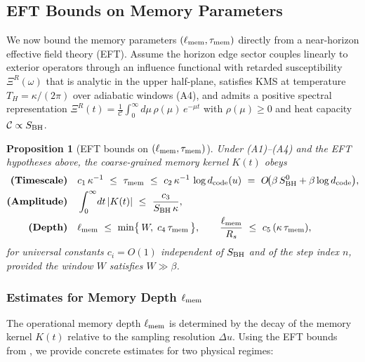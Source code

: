 \documentclass[11pt,a4paper]{article}
\providecommand{\texorpdfstring}[2]{#1}
\theoremstyle{plain}
\newtheorem{proposition}[theorem]{Proposition}
\theoremstyle{definition}
\theoremstyle{remark}
\begin{document}
\subsection{EFT Bounds on Memory Parameters}
\label{sec:eft-bounds}
We now bound the memory parameters $(\ell_{\rm mem},\tau_{\rm mem})$ directly from a near-horizon effective field theory (EFT).
Assume the horizon edge sector couples linearly to exterior operators through an influence functional with retarded susceptibility
$\Xi^R(\omega)$ that is analytic in the upper half-plane, satisfies KMS at temperature $T_H=\kappa/(2\pi)$ over adiabatic windows
(A4), and admits a positive spectral representation $\Xi^R(t)=\frac{1}{\mathcal{C}}\int_0^\infty\!d\mu\,\rho(\mu)\,e^{-\mu t}$ with
$\rho(\mu)\ge 0$ and heat capacity $\mathcal{C}\propto S_{\rm BH}$.

\begin{proposition}[EFT bounds on $(\ell_{\rm mem},\tau_{\rm mem})$]\label{prop:eft-bounds}
Under (A1)--(A4) and the EFT hypotheses above, the coarse-grained memory kernel $K(t)$ obeys
\begin{align}
\textbf{(Timescale)}\quad & c_1\,\kappa^{-1} \ \le\ \tau_{\rm mem}
\ \le\ c_2\,\kappa^{-1}\,\log d_{\rm code}(u)\ =\ O\!\big(\beta\,S_{\rm BH}^0 + \beta\log d_{\rm code}\big), \label{eq:tau-bounds}\\
\textbf{(Amplitude)}\quad & \int_0^\infty\!dt\,|K(t)|\ \le\ \frac{c_3}{S_{\rm BH}\,\kappa}, \label{eq:amp-bound}\\
\textbf{(Depth)}\quad & \ell_{\rm mem}\ \le\ \min\!\big\{\,W,\; c_4\,\tau_{\rm mem}\,\big\},\qquad
\frac{\ell_{\rm mem}}{R_s}\ \le\ c_5\,(\kappa\,\tau_{\rm mem}), \label{eq:depth-bound}
\end{align}
for universal constants $c_i=O(1)$ independent of $S_{\rm BH}$ and of the step index $n$, provided the window $W$ satisfies $W\gg\beta$.
\end{proposition}

\subsubsection{Estimates for Memory Depth \texorpdfstring{$\ell_{\rm mem}$}{l\_mem}}
\label{sec:memory-depth-estimates}

The operational memory depth $\ell_{\rm mem}$ is determined by the decay of the memory kernel $K(t)$ relative to the sampling resolution $\Delta u$.
Using the EFT bounds from , we provide concrete estimates for two physical regimes:
\end{document}
